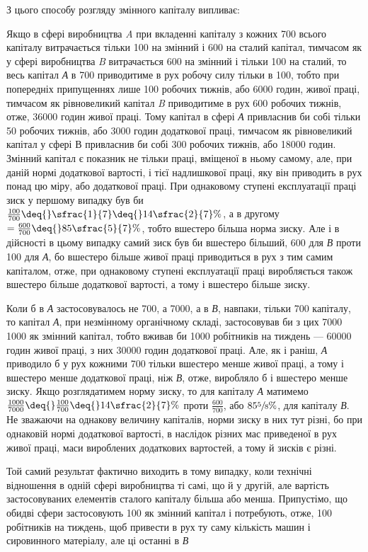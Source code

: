 
З цього способу розгляду змінного капіталу випливає:

Якщо в сфері виробництва \emph{A} при вкладенні капіталу з кожних 700 всього
капіталу витрачається тільки 100 на змінний
і 600 на сталий капітал, тимчасом як у сфері виробництва \emph{B}
витрачається 600 на змінний і тільки 100 на сталий, то весь
капітал \emph{А} в 700 приводитиме в рух робочу силу тільки в 100,
тобто при попередніх припущеннях лише 100 робочих тижнів,
або 6000 годин, живої праці, тимчасом як рівновеликий капітал \emph{B}
приводитиме в рух 600 робочих тижнів, отже, \num{36000} годин живої праці.
Тому капітал в сфері \emph{А} привласнив би собі тільки
50 робочих тижнів, або 3000 годин додаткової праці, тимчасом
як рівновеликий капітал у сфері В привласнив би собі 300 робочих тижнів,
або \num{18000} годин. Змінний капітал є показник не
тільки праці, вміщеної в ньому самому, але, при даній нормі
додаткової вартості, і тієї надлишкової праці, яку він приводить
в рух понад цю міру, або додаткової праці. При однаковому
ступені експлуатації праці зиск у першому випадку був би $\frac{100}{700} \deq{} \sfrac{1}{7} \deq{} 14\sfrac{2}{7}\%$, а
в другому $= \frac{600}{700} \deq{} 85\sfrac{5}{7}\%$, тобто вшестеро
більша норма зиску. Але і в дійсності в цьому випадку самий
зиск був би вшестеро більший, 600 для \emph{В} проти 100 для \emph{А}, бо
вшестеро більше живої праці приводиться в рух з тим самим
капіталом, отже, при однаковому ступені експлуатації праці
виробляється також вшестеро більше додаткової вартості, а тому
і вшестеро більше зиску.

Коли б в \emph{А} застосовувалось не 700, а 7000, а
в \emph{В}, навпаки, тільки 700 капіталу, то
капітал \emph{А}, при незмінному органічному складі, застосовував би
з цих 7000 1000 як змінний
капітал, тобто вживав би 1000 робітників на тиждень — \num{60000} годин живої праці,
з них \num{30000} годин додаткової праці. Але,
як і раніш, \emph{А} приводило б у рух кожними 700 тільки
вшестеро менше живої праці, а тому і вшестеро
менше додаткової праці, ніж \emph{В}, отже, виробляло б і вшестеро
менше зиску. Якщо розглядатимем норму зиску, то для капіталу \emph{А} матимемо
$\frac{1000}{7000} \deq{} \frac{100}{700} \deq{} 14\sfrac{2}{7}\%$
проти $\frac{600}{700}$, або $85\sfrac{5}{8}\%$, для
капіталу \emph{В}. Не зважаючи на однакову величину капіталів, норми
зиску в них тут різні, бо при однаковій нормі додаткової
вартості, в наслідок різних мас приведеної в рух живої праці,
маси вироблених додаткових вартостей, а тому й зисків є різні.

Той самий результат фактично виходить в тому випадку, коли
технічні відношення в одній сфері виробництва ті самі, що й
у другій, але вартість застосовуваних елементів сталого капіталу більша або менша. Припустімо, що
обидві сфери застосовують 100 як змінний капітал і потребують, отже, 100
робітників на тиждень, щоб привести в рух ту саму
кількість машин і сировинного матеріалу, але ці останні в \emph{В}
\parbreak{}  %
